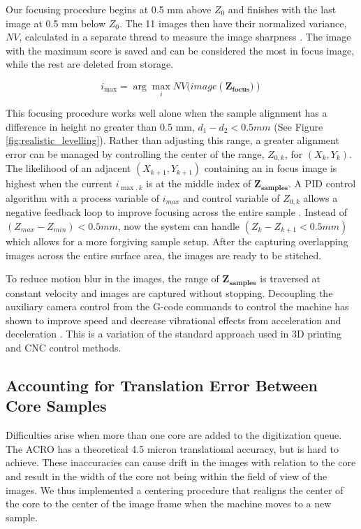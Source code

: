 \documentclass[a4paper,12pt]{article}
\begin{document}
Our focusing procedure begins at 0.5 mm above $Z_0$ and finishes with the last image at 0.5 mm below $Z_0$.
The 11 images then have their normalized variance, $NV$, calculated in a separate thread to measure the image sharpness \citep{sampat_extensive_2014}.
The image with the maximum score is saved and can be considered the most in focus image, while the rest are deleted from storage.

\[
  i_{\max} = \arg\max_{i} NV(image(\boldsymbol{{Z_\text{focus}})})
  \]

This focusing procedure works well alone when the sample alignment has a difference in height no greater than 0.5 mm, $d_1 - d_2 < 0.5 mm $ (See Figure \ref{fig:realistic_levelling}). 
Rather than adjusting this range, a greater alignment error can be managed by controlling the center of the range, $Z_{0,k}$, for $(X_k,Y_k)$. 
The likelihood of an adjacent $(X_{k+1}, Y_{k+1})$ containing an in focus image is highest when the current $i_{{\max,k}}$ is at the middle index of $\boldsymbol{Z_{samples}}$. 
A PID control algorithm with a process variable of $i_{max}$ and control variable of $Z_{0,k}$ allows a negative feedback loop to improve focusing across the entire sample \citep{odwyer_summary_2000}. 
Instead of $(Z_{max} - Z_{min}) < 0.5mm$, now the system can handle $(Z_{k} - Z_{k+1} < 0.5mm)$ which allows for a more forgiving sample setup. After the capturing overlapping images across the entire surface area, the images are ready to be stitched.

To reduce motion blur in the images, the range of $\boldsymbol{Z_{\text{samples}}}$ is traversed at constant velocity and images are captured without stopping. 
Decoupling the auxiliary camera control from the G-code commands to control the machine has shown to improve speed and decrease vibrational effects from acceleration and deceleration \citep{propst_time_2025}.
This is a variation of the standard approach used in 3D printing and CNC control methods. %
  
\subsection{Accounting for Translation Error Between Core Samples}

Difficulties arise when more than one core are added to the digitization queue.
The ACRO has a theoretical 4.5 micron translational accuracy, but is hard to achieve.
These inaccuracies can cause drift in the images with relation to the core and result in the width of the core not being within the field of view of the images.
We thus implemented a centering procedure that realigns the center of the core to the center of the image frame when the machine moves 
to a new sample. 
\end{document}
